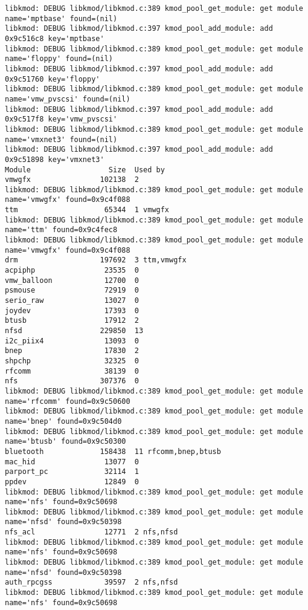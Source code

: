 \documentclass[11pt,a4paper]{article}
\begin{document}
{\begin{shaded}
\begin{verbatim}
libkmod: DEBUG libkmod/libkmod.c:389 kmod_pool_get_module: get module name='mptbase' found=(nil)
libkmod: DEBUG libkmod/libkmod.c:397 kmod_pool_add_module: add 0x9c516c8 key='mptbase'
libkmod: DEBUG libkmod/libkmod.c:389 kmod_pool_get_module: get module name='floppy' found=(nil)
libkmod: DEBUG libkmod/libkmod.c:397 kmod_pool_add_module: add 0x9c51760 key='floppy'
libkmod: DEBUG libkmod/libkmod.c:389 kmod_pool_get_module: get module name='vmw_pvscsi' found=(nil)
libkmod: DEBUG libkmod/libkmod.c:397 kmod_pool_add_module: add 0x9c517f8 key='vmw_pvscsi'
libkmod: DEBUG libkmod/libkmod.c:389 kmod_pool_get_module: get module name='vmxnet3' found=(nil)
libkmod: DEBUG libkmod/libkmod.c:397 kmod_pool_add_module: add 0x9c51898 key='vmxnet3'
Module                  Size  Used by
vmwgfx                102138  2 
libkmod: DEBUG libkmod/libkmod.c:389 kmod_pool_get_module: get module name='vmwgfx' found=0x9c4f088
ttm                    65344  1 vmwgfx
libkmod: DEBUG libkmod/libkmod.c:389 kmod_pool_get_module: get module name='ttm' found=0x9c4fec8
libkmod: DEBUG libkmod/libkmod.c:389 kmod_pool_get_module: get module name='vmwgfx' found=0x9c4f088
drm                   197692  3 ttm,vmwgfx
acpiphp                23535  0 
vmw_balloon            12700  0 
psmouse                72919  0 
serio_raw              13027  0 
joydev                 17393  0 
btusb                  17912  2 
nfsd                  229850  13 
i2c_piix4              13093  0 
bnep                   17830  2 
shpchp                 32325  0 
rfcomm                 38139  0 
nfs                   307376  0 
libkmod: DEBUG libkmod/libkmod.c:389 kmod_pool_get_module: get module name='rfcomm' found=0x9c50600
libkmod: DEBUG libkmod/libkmod.c:389 kmod_pool_get_module: get module name='bnep' found=0x9c504d0
libkmod: DEBUG libkmod/libkmod.c:389 kmod_pool_get_module: get module name='btusb' found=0x9c50300
bluetooth             158438  11 rfcomm,bnep,btusb
mac_hid                13077  0 
parport_pc             32114  1 
ppdev                  12849  0 
libkmod: DEBUG libkmod/libkmod.c:389 kmod_pool_get_module: get module name='nfs' found=0x9c50698
libkmod: DEBUG libkmod/libkmod.c:389 kmod_pool_get_module: get module name='nfsd' found=0x9c50398
nfs_acl                12771  2 nfs,nfsd
libkmod: DEBUG libkmod/libkmod.c:389 kmod_pool_get_module: get module name='nfs' found=0x9c50698
libkmod: DEBUG libkmod/libkmod.c:389 kmod_pool_get_module: get module name='nfsd' found=0x9c50398
auth_rpcgss            39597  2 nfs,nfsd
libkmod: DEBUG libkmod/libkmod.c:389 kmod_pool_get_module: get module name='nfs' found=0x9c50698

\end{verbatim}
\end{shaded}}
\end{document}
